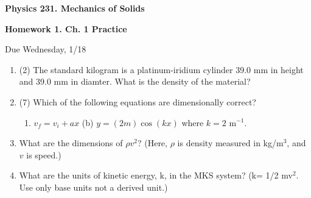 \documentclass[12pt]{article}
\begin{document}
\epsfverbosetrue

%

\begin{centering}
{\Large \bf Physics 231.  Mechanics of Solids }
\end{centering}
\bigskip 

\noindent 

{\bf Homework 1.  Ch. 1 Practice} 

Due Wednesday, 1/18


\begin{enumerate}
\item (2) The standard kilogram is a platinum-iridium cylinder
39.0 mm in height and 39.0 mm in diamter.  What is the
density of the material?

\item (7) Which of the following equations are dimensionally
correct?

\begin{enumerate}
\item $v_f = v_i + ax$ \qquad 
(b) $y = (2m) \cos (kx)$ where $k=2$ m$^{-1}$.
\end{enumerate}



\item What are the dimensions of $\rho v^2$?  (Here, $\rho$ is
density measured in kg/m$^3$, and $v$ is speed.)

\item What are the units of kinetic energy, k, in the MKS system?
(k= 1/2 mv$^2$.  Use only base units not a derived unit.)


\end{enumerate}
\end{document}
